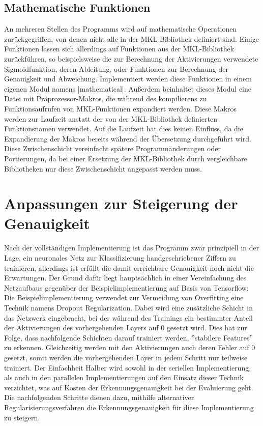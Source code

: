 \documentclass[../main.tex]{subfiles}
\begin{document}
\subsection{Mathematische Funktionen}
An mehreren Stellen des Programms wird auf mathematische Operationen zurückgegriffen, von denen nicht alle in der MKL-Bibliothek definiert sind. Einige Funktionen lassen sich allerdings auf Funktionen aus der MKL-Bibliothek zurückführen, so beispielsweise die zur Berechnung der Aktivierungen verwendete Sigmoidfunktion, deren Ableitung, oder Funktionen zur Berechnung der Genauigkeit und Abweichung. Implementiert werden diese Funktionen in einem eigenen Modul namens |mathematical|. Außerdem beinhaltet dieses Modul eine Datei mit Präprozessor-Makros, die während des kompilierens zu Funktionsaufrufen von MKL-Funktionen expandiert werden. Diese Makros werden zur Laufzeit anstatt der von der MKL-Bibliothek definierten Funktionsnamen verwendet. Auf die Laufzeit hat dies keinen Einfluss, da die Expandierung der Makros bereits während der Übersetzung durchgeführt wird. Diese Zwischenschicht vereinfacht spätere Programmänderungen oder Portierungen, da bei einer Ersetzung der MKL-Bibliothek durch vergleichbare Bibliotheken nur diese Zwischenschicht angepasst werden muss. 

\section{Anpassungen zur Steigerung der Genauigkeit}
Nach der vollständigen Implementierung ist das Programm zwar prinzipiell in der Lage, ein neuronales Netz zur Klassifizierung handgeschriebener Ziffern zu trainieren, allerdings ist erfüllt die damit erreichbare Genauigkeit noch nicht die Erwartungen. Der Grund dafür liegt hauptsächlich in einer Vereinfachung des Netzaufbaus gegenüber der Beispielimplementierung auf Basis von Tensorflow: Die Beispielimplementierung verwendet zur Vermeidung von Overfitting eine Technik namens Dropout Regularization. Dabei wird eine zusätzliche Schicht in das Netzwerk eingebracht, bei der während des Trainings ein bestimmter Anteil der Aktivierungen des vorhergehenden Layers auf \(0\) gesetzt wird. Dies hat zur Folge, dass nachfolgende Schichten darauf trainiert werden, ''stabilere Features'' zu erkennen. Gleichzeitig werden mit den Aktivierungen auch deren Fehler auf \(0\) gesetzt, somit werden die vorhergehenden Layer in jedem Schritt nur teilweise trainiert. Der Einfachheit Halber wird sowohl in der seriellen Implementierung, als auch in den parallelen Implementierungen auf den Einsatz dieser Technik verzichtet, was auf Kosten der Erkennungsgenauigkeit bei der Evaluierung geht. Die nachfolgenden Schritte dienen dazu, mithilfe alternativer Regularisierungsverfahren die Erkennungsgenauigkeit für diese Implementierung zu steigern. 
\end{document}
